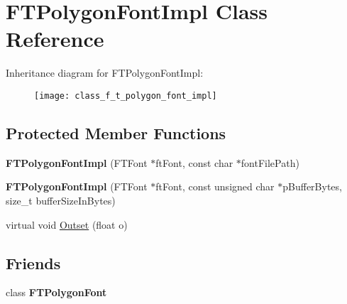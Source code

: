 \hypertarget{class_f_t_polygon_font_impl}{
\section{FTPolygonFontImpl Class Reference}
\label{class_f_t_polygon_font_impl}
}
Inheritance diagram for FTPolygonFontImpl:\begin{figure}[H]
\begin{center}
\leavevmode
\texttt{[image: class\_f\_t\_polygon\_font\_impl]}
\end{center}
\end{figure}
\subsection*{Protected Member Functions}
\begin{DoxyCompactItemize}
\item 
\hypertarget{class_f_t_polygon_font_impl_adbe87469ee12af1a0a1b7999ede7cc98}{
{\bfseries FTPolygonFontImpl} (FTFont $\ast$ftFont, const char $\ast$fontFilePath)}
\label{class_f_t_polygon_font_impl_adbe87469ee12af1a0a1b7999ede7cc98}

\item 
\hypertarget{class_f_t_polygon_font_impl_a140310c1898543ff1dec5865841b630b}{
{\bfseries FTPolygonFontImpl} (FTFont $\ast$ftFont, const unsigned char $\ast$pBufferBytes, size\_\-t bufferSizeInBytes)}
\label{class_f_t_polygon_font_impl_a140310c1898543ff1dec5865841b630b}

\item 
virtual void \hyperlink{class_f_t_polygon_font_impl_ac565010b774c7ddb84db28b422ea9b3e}{Outset} (float o)
\end{DoxyCompactItemize}
\subsection*{Friends}
\begin{DoxyCompactItemize}
\item 
\hypertarget{class_f_t_polygon_font_impl_abd1c273c43e47346ad6c178ec173cc41}{
class {\bfseries FTPolygonFont}}
\label{class_f_t_polygon_font_impl_abd1c273c43e47346ad6c178ec173cc41}

\end{DoxyCompactItemize}


